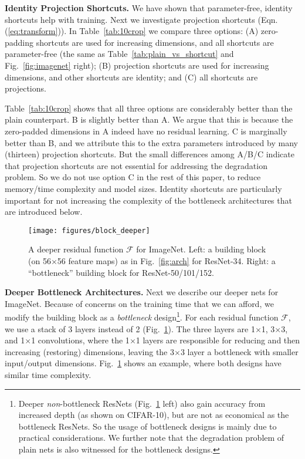 \vspace{6pt}
\noindent\textbf{Identity \wvs Projection Shortcuts.}
We have shown that parameter-free, identity shortcuts help with training. Next we investigate projection shortcuts (Eqn.(\ref{eq:transform})).
In Table~\ref{tab:10crop} we compare three options: (A) zero-padding shortcuts are used for increasing dimensions, and all shortcuts are parameter-free (the same as Table~\ref{tab:plain_vs_shortcut} and Fig.~\ref{fig:imagenet} right); (B) projection shortcuts are used for increasing dimensions, and other shortcuts are identity; and (C) all shortcuts are projections.

Table~\ref{tab:10crop} shows that all three options are considerably better than the plain counterpart.
B is slightly better than A. We argue that this is because the zero-padded dimensions in A indeed have no residual learning. C is marginally better than B, and we attribute this to the extra parameters introduced by many (thirteen) projection shortcuts. But the small differences among A/B/C indicate that projection shortcuts are not essential for addressing the degradation problem. So we do not use option C in the rest of this paper, to reduce memory/time complexity and model sizes. Identity shortcuts are particularly important for not increasing the complexity of the bottleneck architectures that are introduced below.


\begin{figure}[t]
\begin{center}
\hspace{12pt}
\texttt{[image: figures/block\_deeper]}
\end{center}
\caption{A deeper residual function $\mathcal{F}$ for ImageNet. Left: a building block (on 56$\times$56 feature maps) as in Fig.~\ref{fig:arch} for ResNet-34. Right: a ``bottleneck'' building block for ResNet-50/101/152.}
\label{fig:block_deeper}
\vspace{-.6em}
\end{figure}

\vspace{6pt}
\noindent\textbf{Deeper Bottleneck Architectures.} Next we describe our deeper nets for ImageNet. Because of concerns on the training time that we can afford, we modify the building block as a \emph{bottleneck} design\footnote{Deeper \emph{non}-bottleneck ResNets (Fig.~\ref{fig:block_deeper} left) also gain accuracy from increased depth (as shown on CIFAR-10), but are not as economical as the bottleneck ResNets. So the usage of bottleneck designs is mainly due to practical considerations. We further note that the degradation problem of plain nets is also witnessed for the bottleneck designs.}.
For each residual function $\mathcal{F}$, we use a stack of 3 layers instead of 2 (Fig.~\ref{fig:block_deeper}). The three layers are 1$\times$1, 3$\times$3, and 1$\times$1 convolutions, where the 1$\times$1 layers are responsible for reducing and then increasing (restoring) dimensions, leaving the 3$\times$3 layer a bottleneck with smaller input/output dimensions.
Fig.~\ref{fig:block_deeper} shows an example, where both designs have similar time complexity.

